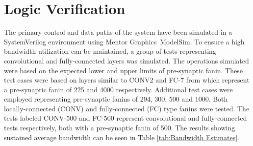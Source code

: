 

\section{Logic Verification}
\label{sec:Logic Verification}

The primary control and data paths of the system have been simulated in a SystemVerilog environment using Mentor Graphics\textregistered ~ModelSim\texttrademark.
To ensure a high bandwidth utilization can be maintained, a group of tests representing convolutional and fully-connected layers was simulated.
The operations simulated were based on the expected lower and upper limits of pre-synaptic fanin. 
These test cases were based on layers similar to CONV2 and FC-7 from \cite{krizhevsky2012imagenet} which represent a pre-synaptic fanin of 225 and 4000 respectively.
Additional test cases were employed representing pre-synaptic fanins of 294, 300, 500 and 1000. Both locally-connected (CONV) and fully-connected (FC) type fanins were tested.
The tests labeled CONV-500 and FC-500 represent convolutional and fully-connected tests respectively, both with a pre-synaptic fanin of 500.
The results showing sustained average bandwidth can be seen in Table \ref{tab:Bandwidth Estimates}.


